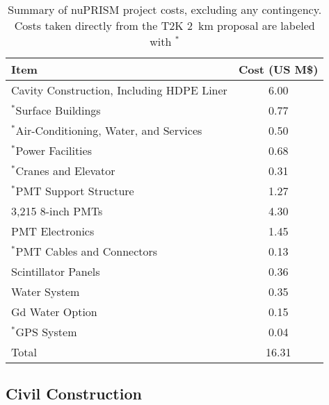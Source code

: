  \begin{table}
  \caption{Summary of nuPRISM project costs, excluding any contingency. Costs taken directly from the T2K 2~km proposal are labeled with $^*$}
  \begin{center}
   \begin{tabular}{ l c}
 \hline
Item & Cost (US M\$) \\
\hline\hline
Cavity Construction, Including HDPE Liner & 6.00 \\
$^*$Surface Buildings & 0.77 \\
$^*$Air-Conditioning, Water, and Services & 0.50\\
$^*$Power Facilities & 0.68\\
$^*$Cranes and Elevator & 0.31\\
$^*$PMT Support Structure & 1.27\\
3,215 8-inch PMTs & 4.30 \\
PMT Electronics & 1.45 \\
$^*$PMT Cables and Connectors & 0.13 \\
Scintillator Panels & 0.36 \\
Water System & 0.35 \\
Gd Water Option & 0.15 \\
$^*$GPS System & 0.04 \\
\hline\hline
Total & 16.31 \\
   \end{tabular}
  \end{center}
 \label{tab:costs}
 \end{table}


\subsection{Civil Construction}

